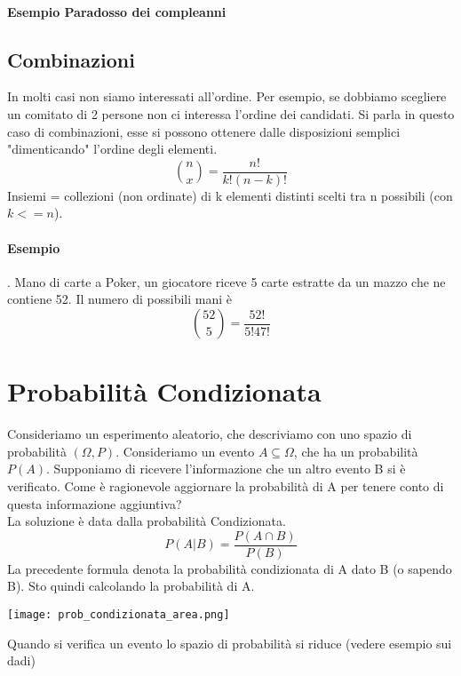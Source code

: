 \paragraph{Esempio Paradosso dei compleanni}

\subsection{Combinazioni}
In molti casi non siamo interessati all'ordine. 
Per esempio, se dobbiamo scegliere un comitato di 2 persone non ci interessa l'ordine 
dei candidati.
Si parla in questo caso di combinazioni, esse si possono ottenere dalle disposizioni semplici
"dimenticando" l'ordine degli elementi.
\begin{equation}
    {n \choose x} = \frac{n!}{k!(n-k)!}
\end{equation}
Insiemi = collezioni (non ordinate) di k elementi distinti scelti tra n possibili (con $k <= n$).
\paragraph{Esempio}. Mano di carte a Poker, un giocatore riceve 5 carte estratte da un mazzo che
ne contiene 52. Il numero di possibili mani è
\begin{equation}
    {52 \choose 5} = \frac{52!}{5!47!}
\end{equation} 

\section{Probabilità Condizionata}
Consideriamo un esperimento aleatorio, che descriviamo con uno spazio di probabilità $(\Omega, P)$.
Consideriamo un evento $A \subseteq \Omega$, che ha un probabilità $P(A)$.
Supponiamo di ricevere l'informazione che un altro evento B si è verificato.
Come è ragionevole aggiornare la probabilità di A per tenere conto di questa informazione aggiuntiva?
\\La soluzione è data dalla probabilità Condizionata.
\begin{equation}
    P(A|B) = \frac{P(A \cap B)}{P(B)}
\end{equation}
La precedente formula denota la probabilità condizionata di A dato B (o sapendo B).
Sto quindi calcolando la probabilità di A.
\begin{center}
    \texttt{[image: prob\_condizionata\_area.png]}    
\end{center}
Quando si verifica un evento lo spazio di probabilità si riduce (vedere esempio sui dadi)

